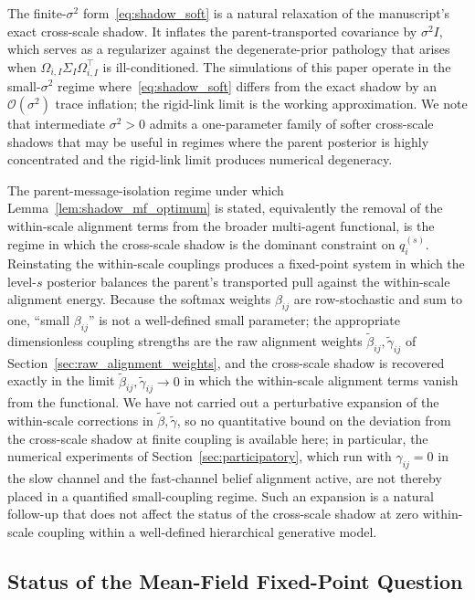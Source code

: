 \documentclass[11pt]{article}
\begin{document}
The finite-$\sigma^2$ form~\eqref{eq:shadow_soft} is a natural relaxation of the manuscript's exact cross-scale shadow. It inflates the parent-transported covariance by $\sigma^2 I$, which serves as a regularizer against the degenerate-prior pathology that arises when $\Omega_{i,I}\Sigma_I\Omega_{i,I}^\top$ is ill-conditioned. The simulations of this paper operate in the small-$\sigma^2$ regime where~\eqref{eq:shadow_soft} differs from the exact shadow by an $\mathcal{O}(\sigma^2)$ trace inflation; the rigid-link limit is the working approximation. We note that intermediate $\sigma^2 > 0$ admits a one-parameter family of softer cross-scale shadows that may be useful in regimes where the parent posterior is highly concentrated and the rigid-link limit produces numerical degeneracy.

The parent-message-isolation regime under which Lemma~\ref{lem:shadow_mf_optimum} is stated, equivalently the removal of the within-scale alignment terms from the broader multi-agent functional, is the regime in which the cross-scale shadow is the dominant constraint on $q_i^{(s)}$. Reinstating the within-scale couplings produces a fixed-point system in which the level-$s$ posterior balances the parent's transported pull against the within-scale alignment energy. Because the softmax weights $\beta_{ij}$ are row-stochastic and sum to one, ``small $\beta_{ij}$'' is not a well-defined small parameter; the appropriate dimensionless coupling strengths are the raw alignment weights $\tilde\beta_{ij}, \tilde\gamma_{ij}$ of Section~\ref{sec:raw_alignment_weights}, and the cross-scale shadow is recovered exactly in the limit $\tilde\beta_{ij}, \tilde\gamma_{ij} \to 0$ in which the within-scale alignment terms vanish from the functional. We have not carried out a perturbative expansion of the within-scale corrections in $\tilde\beta, \tilde\gamma$, so no quantitative bound on the deviation from the cross-scale shadow at finite coupling is available here; in particular, the numerical experiments of Section~\ref{sec:participatory}, which run with $\gamma_{ij} = 0$ in the slow channel and the fast-channel belief alignment active, are not thereby placed in a quantified small-coupling regime. Such an expansion is a natural follow-up that does not affect the status of the cross-scale shadow at zero within-scale coupling within a well-defined hierarchical generative model.
\subsection{Status of the Mean-Field Fixed-Point Question}
\label{app:mf_fixedpoint_status}
\end{document}
